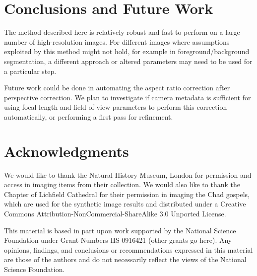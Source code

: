 \documentclass[a4paper]{llncs}
\begin{document}
\section{Conclusions and Future Work}

The method described here is relatively robust and fast to perform on a large number of high-resolution images.
For different images where assumptions exploited by this method might not hold, for example in 
foreground/background segmentation, a different approach or altered parameters
may need to be used for a particular step.

Future work could be done in automating the aspect ratio correction after perspective correction. We plan to
investigate if camera metadata is sufficient for using focal length and field of view parameters to perform this
correction automatically, or performing a first pass for refinement.

\section{Acknowledgments}

We would like to thank the Natural History Museum, London for permission and access in imaging items from their collection. We would also like to thank the Chapter of Lichfield Cathedral for their permission in imaging the Chad gospels,
which are used for the synthetic image results and distributed under a Creative Commons Attribution-NonCommercial-ShareAlike 3.0 Unported License.

This material is based in part upon work supported by the National Science Foundation under Grant Numbers
IIS-0916421 (other grants go here).
Any opinions, findings, and conclusions or recommendations expressed in this material are those of the authors
and do not necessarily reflect the views of the National Science Foundation.



\end{document}
